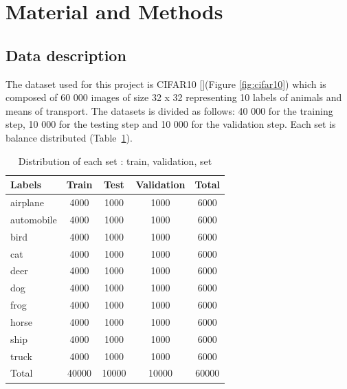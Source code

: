\documentclass[10pt, a4paper, twocolumn]{article} %
\begin{document}




\section{Material and Methods}

\subsection{Data description}
The dataset used for this project is CIFAR10 [\cite{1}](Figure \ref{fig:cifar10}) which is composed of 60 000 images of size 32 x 32 representing 10 labels of animals and means of transport.  The datasets is divided as follows: 40 000 for the training step, 10 000 for the testing step and 10 000 for the validation step. Each set is balance distributed (Table~\ref{tab1}).
\begin{table}
\begin{tabular}{|l|c|c|c|c|}
  \hline
  Labels & Train & Test & Validation & Total\\
  \hline
  airplane & 4000 & 1000 & 1000 & 6000 \\
  \hline
  automobile & 4000 & 1000 & 1000 & 6000\\
  \hline
  bird & 4000 & 1000 & 1000 & 6000\\
  \hline
  cat & 4000 & 1000 & 1000 & 6000\\
  \hline
  deer & 4000 & 1000 & 1000 & 6000\\
  \hline
  dog & 4000 & 1000 & 1000 & 6000\\
  \hline
  frog & 4000 & 1000 & 1000 & 6000\\
  \hline
  horse & 4000 & 1000 & 1000 & 6000\\
  \hline
  ship & 4000 & 1000 & 1000 & 6000 \\
  \hline
  truck & 4000 & 1000 & 1000 & 6000\\
  \hline
  Total & 40000 & 10000 & 10000 & 60000\\
  \hline
\end{tabular}
\caption{\label{tab1} Distribution of each set : train, validation, set}
\end{table}
\end{document}
